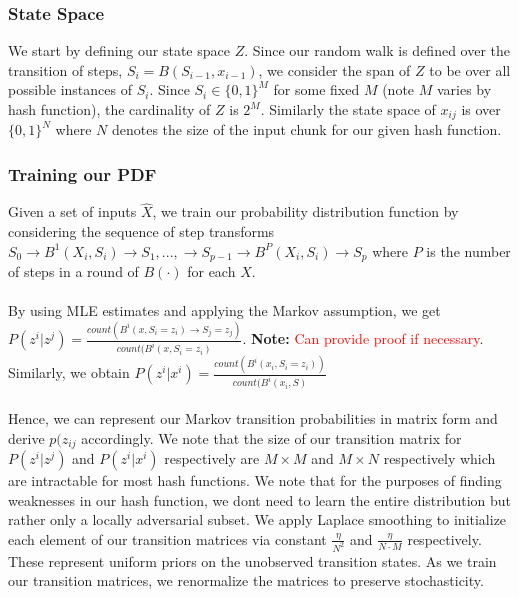 \subsubsection{State Space}
We start by defining our state space $Z$. Since our random walk is defined over the transition of steps, $S_{i} = B(S_{i-1}, x_{i-1})$, we consider the span of $Z$ to be over all possible instances of $S_{i}$. Since $S_{i} \in \{0, 1\}^{M}$ for some fixed $M$ (note $M$ varies by hash function), the cardinality of $Z$ is $2^{M}$. Similarly the state space of $x_{ij}$ is over $ \{0, 1\}^{N}$ where $N$ denotes the size of the input chunk for our given hash function.


\subsubsection{Training our PDF}
\label{MarkovProcess}
Given a set of inputs $\hat{X}$, we train our probability distribution function by considering the sequence of step transforms $S_{0} \rightarrow B^{1}(X_{i}, S_{i}) \rightarrow S_{1},..., \rightarrow S_{p-1} \rightarrow B^{P}(X_{i}, S_{i}) \rightarrow S_{p}$ where $P$ is the number of steps in a round of $B(\cdot)$ for each $X$. 
\\
\\
By using MLE estimates and applying the Markov assumption, we get $P(z^{i} | z^{j}) = \frac{count(B^{i}(x, S_{i} = z_{i}) \rightarrow S_{j} = z_{j})}{count(B^{i}(x, S_{i} = z_{i})}$. \textbf{Note:} \textcolor{red}{Can provide proof if necessary}. Similarly, we obtain $P(z^{i} | x^{i}) = \frac{count(B^{i}(x_{i}, S_{i} = z_{i}))}{count(B^{i}(x_{i}, S)}$
\\
\\
Hence, we can represent our Markov transition probabilities in matrix form and derive $p(z_{ij}$ accordingly. We note that the size of our transition matrix for $P(z^{i} | z^{j})$ and $P(z^{i} | x^{i})$ respectively are $M \times M$ and $M \times N$ respectively which are intractable for most hash functions. We note that for the purposes of finding weaknesses in our hash function, we dont need to learn the entire distribution but rather only a locally adversarial subset. We apply Laplace smoothing to initialize each element of our transition matrices via constant $\frac{\eta}{N^{2}}$ and $\frac{\eta}{N \cdot M}$ respectively. These represent uniform priors on the unobserved transition states. As we train our transition matrices, we renormalize the matrices to preserve stochasticity.

